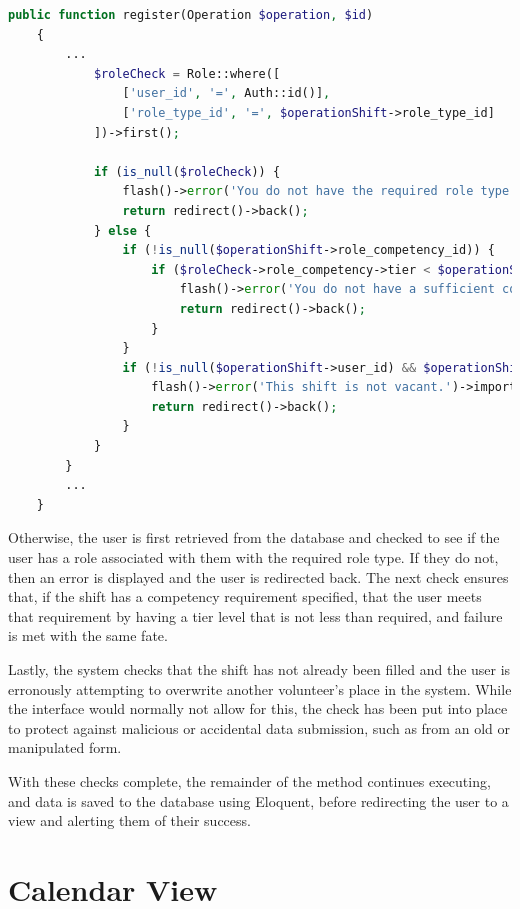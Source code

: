 \begin{lstlisting}[language=PHP, breaklines]
    public function register(Operation $operation, $id)
    {
        ...
            $roleCheck = Role::where([
                ['user_id', '=', Auth::id()],
                ['role_type_id', '=', $operationShift->role_type_id]
            ])->first();
            
            if (is_null($roleCheck)) {
                flash()->error('You do not have the required role type.')->important();
                return redirect()->back();
            } else {
                if (!is_null($operationShift->role_competency_id)) {
                    if ($roleCheck->role_competency->tier < $operationShift->role_competency->tier) {
                        flash()->error('You do not have a sufficient competency / grade tier.')->important();
                        return redirect()->back();
                    }
                }
                if (!is_null($operationShift->user_id) && $operationShift->user_id !== Auth::id()) {
                    flash()->error('This shift is not vacant.')->important();
                    return redirect()->back();
                }
            }
        }
        ...
    }
\end{lstlisting}

Otherwise, the user is first retrieved from the database and checked to see if the user has a role associated with them with the required role type. If they do not, then an error is displayed and the user is redirected back. The next check ensures that, if the shift has a competency requirement specified, that the user meets that requirement by having a tier level that is not less than required, and failure is met with the same fate.

Lastly, the system checks that the shift has not already been filled and the user is erronously attempting to overwrite another volunteer's place in the system. While the interface would normally not allow for this, the check has been put into place to protect against malicious or accidental data submission, such as from an old or manipulated form.

With these checks complete, the remainder of the method continues executing, and data is saved to the database using Eloquent, before redirecting the user to a view and alerting them of their success.

\section{Calendar View}

